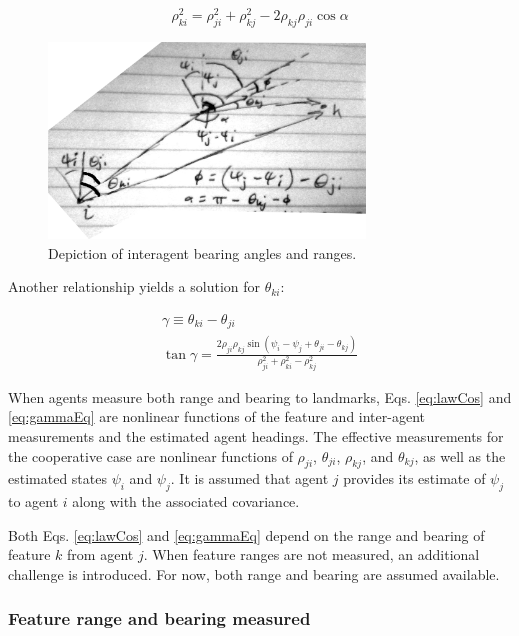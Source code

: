 \documentclass{aiaa-tc}
\begin{document}
\begin{equation}
\rho_{ki}^2 = \rho_{ji}^2+\rho_{kj}^2 - 2\rho_{kj}\rho_{ji}\cos{\alpha}
\label{eq:lawCos}
\end{equation}

\begin{figure}[tb!]
\centering
\includegraphics[width=0.75\textwidth]{../cooperative_triangle.png}
\caption{Depiction of interagent bearing angles and ranges.}
\label{fig:coop_triangle}
\end{figure}

Another relationship yields a solution for $\theta_{ki}$:

\begin{align}
\gamma \equiv \theta_{ki}-\theta_{ji}\\%
\tan{\gamma} = \frac{ 2\rho_{ji}\rho_{kj}\sin{(\psi_i - \psi_j + \theta_{ji} - \theta_{kj})} }{ \rho_{ji}^2 + \rho_{ki}^2 - \rho_{kj}^2 }
\label{eq:gammaEq}
\end{align}

When agents measure both range and bearing to landmarks, Eqs. \ref{eq:lawCos} and \ref{eq:gammaEq} are nonlinear functions of the feature and inter-agent measurements and the estimated agent headings. The effective measurements for the cooperative case are nonlinear functions of $\rho_{ji}$, $\theta_{ji}$, $\rho_{kj}$, and $\theta_{kj}$, as well as the estimated states $\psi_i$ and $\psi_j$. It is assumed that agent $j$ provides its estimate of $\psi_j$ to agent $i$ along with the associated covariance.

Both Eqs. \ref{eq:lawCos} and \ref{eq:gammaEq} depend on the range and bearing of feature $k$ from agent $j$. When feature ranges are not measured, an additional challenge is introduced. For now, both range and bearing are assumed available.

\subsubsection{Feature range and bearing measured}
\end{document}
